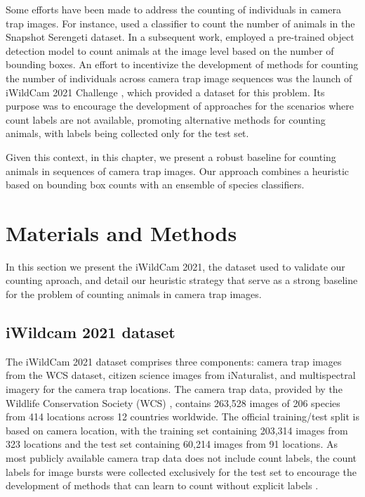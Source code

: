 Some efforts have been made to address the counting of individuals in camera
trap images. For instance, \citet{norouzzadeh2018automatically} used a
classifier to count the number of animals in the Snapshot Serengeti dataset. In
a subsequent work, \citet{norouzzadeh2021deep} employed a pre-trained object
detection model to count animals at the image level based on the number of
bounding boxes. An effort to incentivize the development of methods for
counting the number of individuals across camera trap image sequences was the
launch of iWildCam 2021 Challenge \citep{beery2021iwildcam}, which provided a
dataset for this problem. Its purpose was to encourage the development of
approaches for the scenarios where count labels are not available, promoting
alternative methods for counting animals, with labels being collected only for
the test set.

Given this context, in this chapter, we present a robust baseline for counting
animals in sequences of camera trap images. Our approach combines a heuristic
based on bounding box counts with an ensemble of species classifiers.

\section{Materials and Methods}

In this section we present the iWildCam 2021, the dataset used to validate our
counting aproach, and detail our heuristic strategy that serve as a strong
baseline for the problem of counting animals in camera trap images.

\subsection{{iWildcam} 2021 dataset}

The iWildCam 2021 dataset comprises three components: camera trap
images from the WCS dataset, citizen science images from iNaturalist, and
multispectral imagery for the camera trap locations. The camera trap data,
provided by the Wildlife Conservation Society (WCS) \citep{wcs_lila}, contains
263,528 images of 206 species from 414 locations across 12 countries worldwide.
The official training/test split is based on camera location, with the training
set containing 203,314 images from 323 locations and the test set containing
60,214 images from 91 locations. As most publicly available camera trap data
does not include count labels, the count labels for image bursts were collected
exclusively for the test set to encourage the development of methods that can
learn to count without explicit labels \citep{beery2021iwildcam}.

